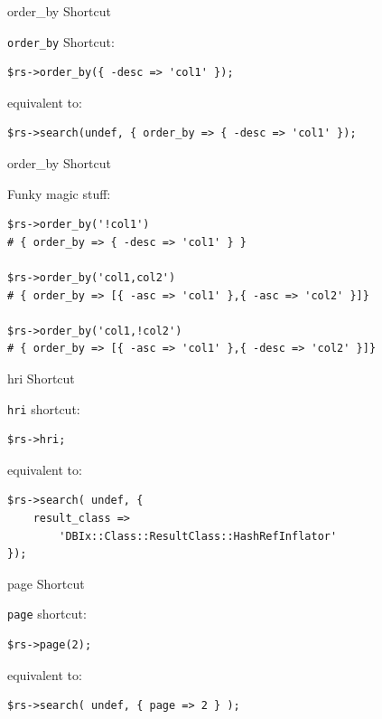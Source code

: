 \begin{frame}[fragile]{order\_by Shortcut}

\verb|order_by| Shortcut:

\begin{lstlisting}
$rs->order_by({ -desc => 'col1' });
\end{lstlisting}

equivalent to:

\begin{lstlisting}
$rs->search(undef, { order_by => { -desc => 'col1' });
\end{lstlisting}

\end{frame}

\begin{frame}[fragile]{order\_by Shortcut}

Funky magic stuff:
\begin{lstlisting}
$rs->order_by('!col1')
# { order_by => { -desc => 'col1' } }

$rs->order_by('col1,col2')
# { order_by => [{ -asc => 'col1' },{ -asc => 'col2' }]}

$rs->order_by('col1,!col2')
# { order_by => [{ -asc => 'col1' },{ -desc => 'col2' }]}
\end{lstlisting}
\end{frame}

\begin{frame}[fragile]{hri Shortcut}

\verb|hri| shortcut:

\begin{lstlisting}
$rs->hri;
\end{lstlisting}

equivalent to:

\begin{lstlisting}
$rs->search( undef, {
    result_class => 
        'DBIx::Class::ResultClass::HashRefInflator'
});
\end{lstlisting}
\end{frame}

\begin{frame}[fragile]{page Shortcut}

\verb|page| shortcut:

\begin{lstlisting}
$rs->page(2);
\end{lstlisting}

equivalent to:

\begin{lstlisting}
$rs->search( undef, { page => 2 } );
\end{lstlisting}

\end{frame}

